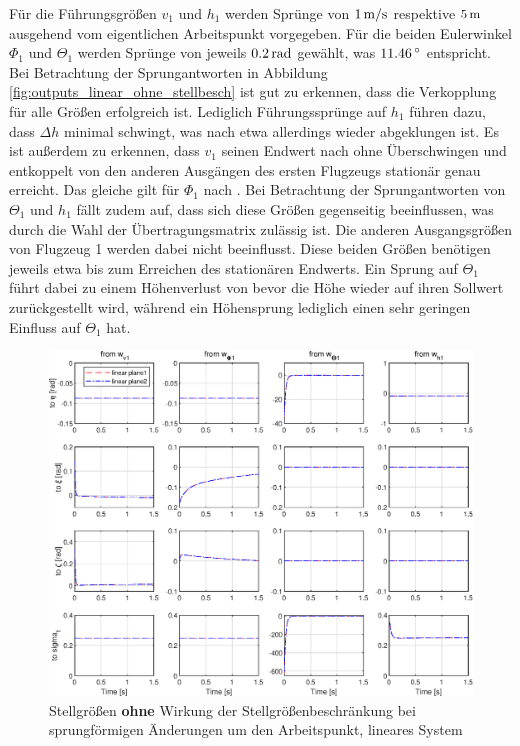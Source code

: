 Für die Führungsgrößen $v_1$ und $h_1$ werden Sprünge von $1\,\mathrm{m/s}$ respektive $5\,\mathrm{m}$ ausgehend vom eigentlichen Arbeitspunkt vorgegeben. Für die beiden Eulerwinkel $\Phi_1$ und $\Theta_1$ werden Sprünge von jeweils $0.2\,\mathrm{rad}$ gewählt, was $\valunit{11.46}{\degree}$ entspricht. Bei Betrachtung der Sprungantworten in Abbildung \ref{fig:outputs_linear_ohne_stellbesch} ist gut zu erkennen, dass die Verkopplung für alle Größen erfolgreich ist. Lediglich Führungssprünge auf $h_1$ führen dazu, dass $\Delta h$ minimal schwingt, was nach etwa  allerdings wieder abgeklungen ist. Es ist außerdem zu erkennen, dass $v_1$ seinen Endwert nach  ohne Überschwingen und entkoppelt von den anderen Ausgängen des ersten Flugzeugs stationär genau erreicht. Das gleiche gilt für $\Phi_1$ nach . Bei Betrachtung der Sprungantworten von $\Theta_1$ und $h_1$ fällt zudem auf, dass sich diese Größen gegenseitig beeinflussen, was durch die Wahl der Übertragungsmatrix zulässig ist. Die anderen Ausgangsgrößen von Flugzeug 1 werden dabei nicht beeinflusst. Diese beiden Größen benötigen jeweils etwa  bis zum Erreichen des stationären Endwerts. Ein Sprung auf $\Theta_1$ führt dabei zu einem Höhenverlust von  bevor die Höhe wieder auf ihren Sollwert zurückgestellt wird, während ein Höhensprung lediglich einen sehr geringen Einfluss auf $\Theta_1$ hat. 
\begin{figure}[H] %
	\centering
	\includegraphics[width=\linewidth]{./Bilder/stellgr_linear_ohne_stellbeschr.eps}
	\caption{Stellgrößen \textbf{ohne} Wirkung der Stellgrößenbeschränkung bei sprungförmigen Änderungen um den Arbeitspunkt, lineares System}
	\label{fig:stellgr_linear_ohne_stellbesch}
\end{figure}
